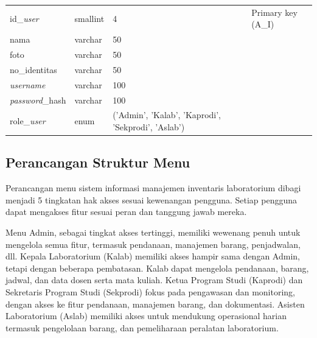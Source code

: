 \begin{enumerate}
{\begin{longtable}{l l l l}
				      id\_\textit{user}       & smallint               & 4                                                  & Primary key (A\_I)    \\
				      nama                    & varchar                & 50                                                 &                       \\
				      foto                    & varchar                & 50                                                 &                       \\
				      no\_identitas           & varchar                & 50                                                 &                       \\
				      \textit{username}       & varchar                & 100                                                &                       \\
				      \textit{password}\_hash & varchar                & 100                                                &                       \\
				      role\_\textit{user}     & enum                   & ('Admin', 'Kalab', 'Kaprodi', 'Sekprodi', 'Aslab') &                       \\
				      \hline
			      \end{longtable}
		      }

\end{enumerate}

\subsection{Perancangan Struktur Menu}
Perancangan menu sistem informasi manajemen inventaris laboratorium dibagi menjadi 5 tingkatan hak akses sesuai kewenangan pengguna. Setiap pengguna dapat mengakses fitur sesuai peran dan tanggung jawab mereka.

Menu Admin, sebagai tingkat akses tertinggi, memiliki wewenang penuh untuk mengelola semua fitur, termasuk pendanaan, manajemen barang, penjadwalan, dll. Kepala Laboratorium (Kalab) memiliki akses hampir sama dengan Admin, tetapi dengan beberapa pembatasan. Kalab dapat mengelola pendanaan, barang, jadwal, dan data dosen serta mata kuliah. Ketua Program Studi (Kaprodi) dan Sekretaris Program Studi (Sekprodi) fokus pada pengawasan dan monitoring, dengan akses ke fitur pendanaan, manajemen barang, dan dokumentasi. Asisten Laboratorium (Aslab) memiliki akses untuk mendukung operasional harian termasuk pengelolaan barang, dan pemeliharaan peralatan laboratorium.

